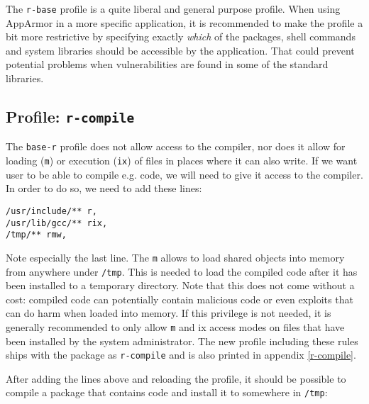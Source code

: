 \documentclass[article]{jss}
\begin{document}
The \texttt{r-base} profile is a quite liberal and general purpose profile. When
using AppArmor in a more specific application, it is recommended to make the
profile a bit more restrictive by specifying exactly \emph{which} of the
packages, shell commands and system libraries should be accessible by the
application. That could prevent potential problems when vulnerabilities are
found in some of the standard libraries.

\subsection[Profile: r-compile]{Profile: \texttt{r-compile}}

The \texttt{base-r} profile does not allow access to the compiler, nor does it
allow for loading (\texttt{m}) or execution (\texttt{ix}) of files in places
where it can also write. If we want user to be able to compile e.g.
 code, we will need to give it access to the compiler. In order
to do so, we need to add these lines:

\begin{verbatim}
/usr/include/** r,
/usr/lib/gcc/** rix,
/tmp/** rmw,
\end{verbatim}

Note especially the last line. The \texttt{m} allows  to load shared
objects into memory from anywhere under \texttt{/tmp}. This is needed to load
the compiled code after it has been installed to a temporary directory. Note
that this does not come without a cost: compiled code can potentially contain
malicious code or even exploits that can do harm when loaded into memory. If
this privilege is not needed, it is generally recommended to only allow
\texttt{m} and {ix} access modes on files that have been installed by the
system administrator. The new profile including these rules ships with the
package as \texttt{r-compile} and is also printed in appendix \ref{r-compile}.

After adding the lines above and reloading the profile, it should be possible to
compile a package that contains  code and install it to somewhere
in \texttt{/tmp}:
\end{document}
